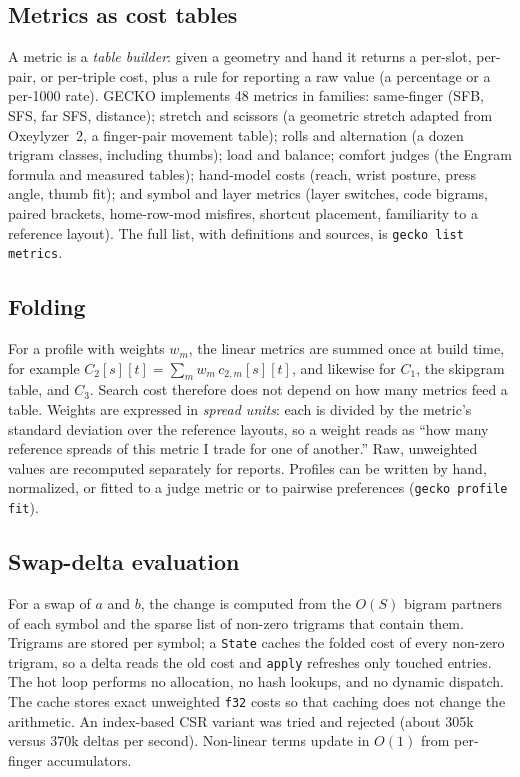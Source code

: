 \documentclass{gecko-paper}
\begin{document}
\begin{paperbody}
\subsection{Metrics as cost tables}
A metric is a \emph{table builder}: given a geometry and hand it returns a per-slot, per-pair, or per-triple cost, plus a rule for reporting a raw value (a percentage or a per-1000 rate). GECKO implements 48 metrics in families: same-finger (SFB, SFS, far SFS, distance); stretch and scissors (a geometric stretch adapted from Oxeylyzer~2, a finger-pair movement table); rolls and alternation (a dozen trigram classes, including thumbs); load and balance; comfort judges (the Engram formula and measured tables); hand-model costs (reach, wrist posture, press angle, thumb fit); and symbol and layer metrics (layer switches, code bigrams, paired brackets, home-row-mod misfires, shortcut placement, familiarity to a reference layout). The full list, with definitions and sources, is \texttt{gecko list metrics}.

\subsection{Folding}
For a profile with weights $w_m$, the linear metrics are summed once at build time, for example $C_2[s][t]=\sum_m w_m\,c_{2,m}[s][t]$, and likewise for $C_1$, the skipgram table, and $C_3$. Search cost therefore does not depend on how many metrics feed a table. Weights are expressed in \emph{spread units}: each is divided by the metric's standard deviation over the reference layouts, so a weight reads as ``how many reference spreads of this metric I trade for one of another.'' Raw, unweighted values are recomputed separately for reports. Profiles can be written by hand, normalized, or fitted to a judge metric or to pairwise preferences (\texttt{gecko profile fit}).

\subsection{Swap-delta evaluation}
For a swap of $a$ and $b$, the change is computed from the $O(S)$ bigram partners of each symbol and the sparse list of non-zero trigrams that contain them. Trigrams are stored per symbol; a \texttt{State} caches the folded cost of every non-zero trigram, so a delta reads the old cost and \texttt{apply} refreshes only touched entries. The hot loop performs no allocation, no hash lookups, and no dynamic dispatch. The cache stores exact unweighted \texttt{f32} costs so that caching does not change the arithmetic. An index-based CSR variant was tried and rejected (about 305k versus 370k deltas per second). Non-linear terms update in $O(1)$ from per-finger accumulators.


\end{paperbody}
\end{document}
